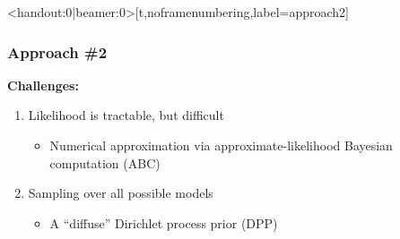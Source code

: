 \begin{frame}<handout:0|beamer:0>[t,noframenumbering,label=approach2]
    \frametitle{Approach \#2}

    \textbf{Challenges:} \\
    \begin{minipage}[t][0.35\textheight][t]{\linewidth}
    \begin{enumerate}
        \item<1-> Likelihood is tractable, but difficult
        \begin{itemize}
            \item<2-> Numerical approximation via approximate-likelihood Bayesian computation (ABC)
        \end{itemize}
    \end{enumerate}
    \end{minipage}

    \begin{minipage}[t][0.35\textheight][t]{\linewidth}
    \begin{enumerate}
        \setcounter{enumi}{1}
        \item<1-> Sampling over all possible models
        \begin{itemize}
            \item<3-> A ``diffuse'' Dirichlet process prior (DPP)
        \end{itemize}
    \end{enumerate}
    \end{minipage}
\end{frame}


\blankslide

